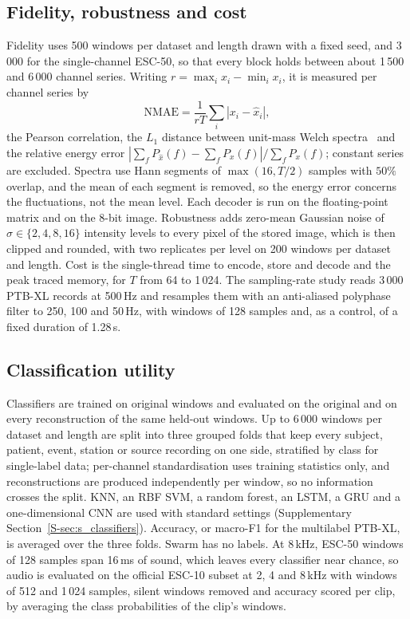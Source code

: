\documentclass[preprint,review,12pt]{elsarticle}
\begin{document}
\subsection{Fidelity, robustness and cost}
Fidelity uses 500 windows per dataset and length drawn with a fixed seed, and 3\,000 for the single-channel ESC-50, so that every block holds between about 1\,500 and 6\,000 channel series. Writing $r=\max_ix_i-\min_ix_i$, it is measured per channel series by
\[
\mathrm{NMAE}=\frac{1}{rT}\sum_i|x_i-\hat x_i|,
\]
the Pearson correlation, the $L_1$ distance between unit-mass Welch spectra~\cite{Welch1967} and the relative energy error $|\sum_fP_{\hat x}(f)-\sum_fP_x(f)|/\sum_fP_x(f)$; constant series are excluded. Spectra use Hann segments of $\max(16,T/2)$ samples with $50\%$ overlap, and the mean of each segment is removed, so the energy error concerns the fluctuations, not the mean level. Each decoder is run on the floating-point matrix and on the 8-bit image. Robustness adds zero-mean Gaussian noise of $\sigma\in\{2,4,8,16\}$ intensity levels to every pixel of the stored image, which is then clipped and rounded, with two replicates per level on 200 windows per dataset and length. Cost is the single-thread time to encode, store and decode and the peak traced memory, for $T$ from 64 to 1\,024. The sampling-rate study reads 3\,000 PTB-XL records at 500\,Hz and resamples them with an anti-aliased polyphase filter to 250, 100 and 50\,Hz, with windows of 128 samples and, as a control, of a fixed duration of 1.28\,s.

\subsection{Classification utility}
Classifiers are trained on original windows and evaluated on the original and on every reconstruction of the same held-out windows. Up to 6\,000 windows per dataset and length are split into three grouped folds that keep every subject, patient, event, station or source recording on one side, stratified by class for single-label data; per-channel standardisation uses training statistics only, and reconstructions are produced independently per window, so no information crosses the split. KNN, an RBF SVM, a random forest, an LSTM, a GRU and a one-dimensional CNN are used with standard settings (Supplementary Section~\ref{S-sec:s_classifiers}). Accuracy, or macro-F1 for the multilabel PTB-XL, is averaged over the three folds. Swarm has no labels. At 8\,kHz, ESC-50 windows of 128 samples span 16\,ms of sound, which leaves every classifier near chance, so audio is evaluated on the official ESC-10 subset at 2, 4 and 8\,kHz with windows of 512 and 1\,024 samples, silent windows removed and accuracy scored per clip, by averaging the class probabilities of the clip's windows.
\end{document}
